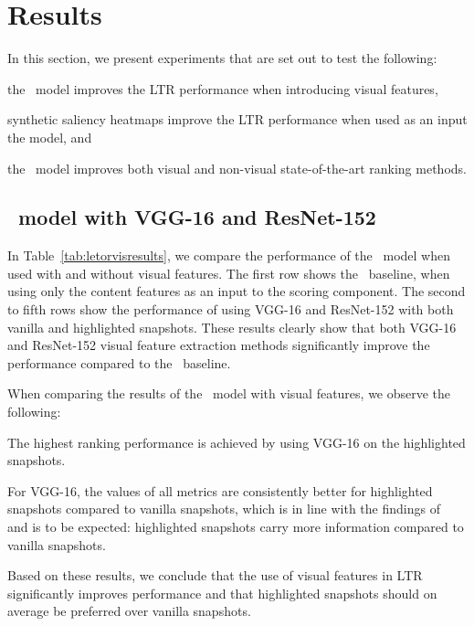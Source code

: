 
\section{Results}
In this section, we present experiments that are set out to test the following:
\begin{inparaenum}[(i)]
    \item the \modelname~model improves the \ac{LTR} performance when introducing visual features, 
    \item synthetic saliency heatmaps improve the \ac{LTR} performance when used as an input the \modelname{} model, and
    \item the \modelname~model improves both visual and non-visual state-of-the-art ranking methods.
\end{inparaenum}

\subsection{\modelname~model with VGG-16 and ResNet-152}
In Table~\ref{tab:letorvisresults}, we compare the performance of the \modelname~model when used with and without visual features.
The first row shows the \modelname~baseline, when using only the content features as an input to the scoring component.
The second to fifth rows show the performance of using VGG-16 and ResNet-152 with both vanilla and highlighted snapshots. 
These results clearly show that both VGG-16 and ResNet-152 visual feature extraction methods significantly improve the performance compared to the \modelname~baseline. 

When comparing the results of the \modelname~model with visual features, we observe the following:
\begin{inparaenum}[(i)]
    \item The highest ranking performance is achieved by using VGG-16 on the highlighted snapshots.
    \item For VGG-16, the values of all metrics are consistently better for highlighted snapshots compared to vanilla snapshots, which is in line with the findings of~\cite{fan2017learning} and is to be expected: highlighted snapshots carry more information compared to vanilla snapshots.
\end{inparaenum}
Based on these results, we conclude that the use of visual features in \ac{LTR} significantly improves performance
and that highlighted snapshots should on average be preferred over vanilla snapshots.

